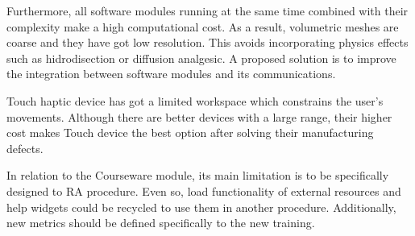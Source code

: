 Furthermore, all software modules running at the same time combined with their complexity make a high computational cost. As a result, volumetric meshes are coarse and they have got low resolution. This avoids incorporating physics effects such as hidrodisection or diffusion analgesic. A proposed solution is to improve the integration between software modules and its communications.



Touch haptic device has got a limited workspace which constrains the user's movements. Although there are better devices with a large range, their higher cost makes Touch device the best option after solving their manufacturing defects.


In relation to the \acs{Courseware} module, its main limitation is to be specifically designed to \acs{RA} procedure. Even so, load functionality of external resources and help widgets could be recycled to use them in another procedure. Additionally, new metrics should be defined specifically to the new training.



